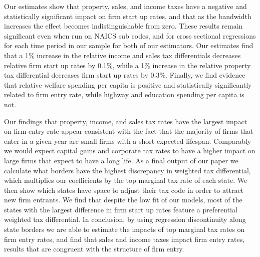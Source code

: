 \documentclass[12 pt, a4paper]{article}
\begin{document}
Our estimates show that property, sales, and income taxes have a negative and statistically significant impact on firm start up rates, and that as the bandwidth increases the effect becomes indistinguishable from zero. These results remain significant even when run on NAICS sub codes, and for cross sectional  regressions for each time period in our sample for both of our estimators. Our estimates find that a 1\% increase in the relative income and sales tax differentials decreases relative firm start up rates by 0.1\%, while a 1\% increase in the relative property tax differential decreases firm start up rates by 0.3\%. Finally, we find evidence that relative welfare spending per capita is positive and statistically significantly related to firm entry rate, while highway and education spending per capita is not.

Our findings that property, income, and sales tax rates have the largest impact on firm entry rate appear consistent with the fact that the majority of firms that enter in a given year are small firms with a short expected lifespan. Comparably we would expect capital gains and corporate tax rates to have a higher impact on large firms that expect to have a long life. As a final output of our paper we calculate what borders have the highest discrepancy in weighted tax differential, which multiplies our coefficients by the top marginal tax rate of each state. We then show which states have space to adjust their tax code in order to attract new firm entrants. We find that despite the low fit of our models, most of the states with the largest difference in firm start up rates feature a preferential weighted tax differential. In conclusion, by using regression discontinuity along state borders we are able to estimate the impacts of top marginal tax rates on firm entry rates, and find that sales and income taxes impact firm entry rates, results that are congruent with the structure of firm entry.
\end{document}
